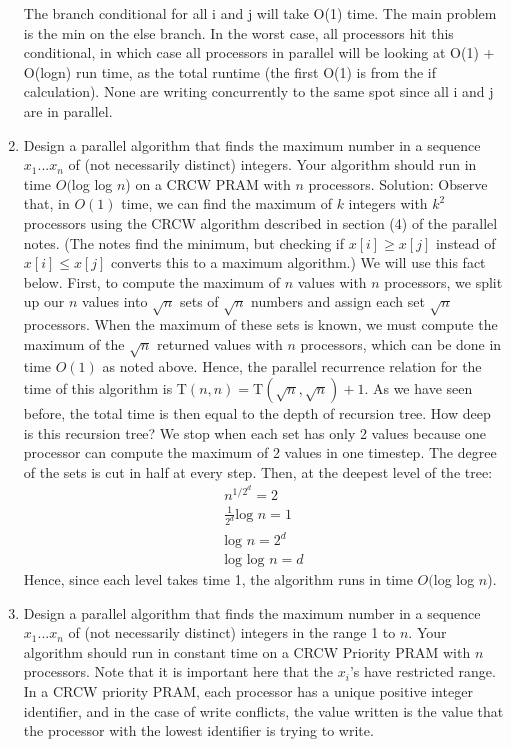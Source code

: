 \documentclass{article}
\begin{document}
\begin{enumerate}
The branch conditional for all i and j will take O(1) time. The main problem is the min on the else branch. In the worst case, all processors hit this conditional, in which case all processors in parallel will be looking at O(1) + O(logn) run time, as the total runtime (the first O(1) is from the if calculation). None are writing concurrently to the same spot since all i and j are in parallel.
\newline
\setcounter{enumi}{16}
\item Design a parallel algorithm that finds the maximum number in a sequence $x_1... x_n$ of (not necessarily distinct) integers. Your algorithm should run in time $O($log log $n$) on a CRCW PRAM with $n$ processors.
\newline
\newline Solution: Observe that, in $O(1)$ time, we can find the maximum of $k$ integers with $k^2$ processors using the CRCW algorithm described in section (4) of the parallel notes. (The notes find the minimum, but checking if $x[i]\ge x[j]$ instead of $x[i]\le x[j]$ converts this to a maximum algorithm.) We will use this fact below. First, to compute the maximum of $n$ values with $n$ processors, we split up our $n$ values into $\sqrt{n}$ sets of $\sqrt{n}$ numbers and assign each set $\sqrt{n}$ processors. When the maximum of these sets is known, we must compute the maximum of the $\sqrt{n}$ returned values with $n$ processors, which can be done in time $O(1)$ as noted above. Hence, the parallel recurrence relation for the time of this algorithm is T$(n,n)=$T$(\sqrt{n},\sqrt{n})+1$. As we have seen before, the total time is then equal to the depth of recursion tree. How deep is this recursion tree? We stop when each set has only 2 values because one processor can compute the maximum of 2 values in one timestep. The degree of the sets is cut in half at every step. Then, at the deepest level of the tree:
\begin{align*}
n^{1/2^d}=2\\
 \frac{1}{2^d}\text{log }n=1\\
 \text{log }n=2^d\\
 \text{log log }n=d
\end{align*}
Hence, since each level takes time 1, the algorithm runs in time $O($log log $n$).
\newline
\item Design a parallel algorithm that finds the maximum number in a sequence $x_1...x_n$ of (not necessarily distinct) integers in the range 1 to $n$. Your algorithm should run in constant time on a CRCW Priority PRAM with $n$ processors. Note that it is important here that the $x_i$'s have restricted range. In a CRCW priority PRAM, each processor has a unique positive integer identifier, and in the case of write conflicts, the value written is the value that the processor with the lowest identifier is trying to write.

\end{enumerate}
\end{document}

